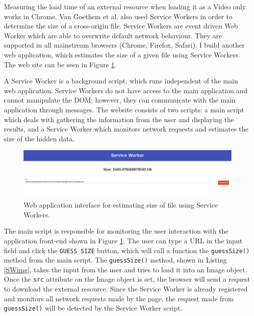 \documentclass[10pt,a4paper,twoside]{book}
\begin{document}
Measuring the load time of an external resource when loading it as a Video only works in Chrome. Van Goethem et al. \cite{van2015clock} also used Service Workers in order to determine the size of a cross-origin file. Service Workers are event driven Web Worker which are able to overwrite default network behaviour. They are supported in all mainstream browsers (Chrome, Firefox, Safari). I build another web application, which estimates the size of a given file using Service Workers. The web site can be seen in Figure \ref{fig:swguess}.

A Service Worker is a background script, which runs independent of the main web application. Service Workers do not have access to the main application and cannot manipulate the DOM; however, they can communicate with the main application through messages. The website consists of two scripts: a main script which deals with gathering the information from the user and displaying the results, and a Service Worker which monitors network requests and estimates the size of the hidden data.

\begin{figure}[h]
\centering
\includegraphics[width=\textwidth]{figures/sw_size.png}
\caption{Web application interface for estimating size of file using Service Workers.}
\label{fig:swguess}
\end{figure}

The main script is responsible for monitoring the user interaction with the application front-end shown in Figure \ref{fig:swguess}. The user can type a URL in the input field and click the \texttt{GUESS SIZE} button, which will call a function the \texttt{guessSize()} method from the main script. The \texttt{guessSize()} method, shown in Listing \ref{SWimg}, takes the input from the user and tries to load it into an Image object. Once the \texttt{src} attribute on the Image object is set, the browser will send a request to download the external resource. Since the Service Worker is already registered and monitors all network requests made by the page, the request made from \texttt{guessSize()} will be detected by the Service Worker script.

\end{document}
